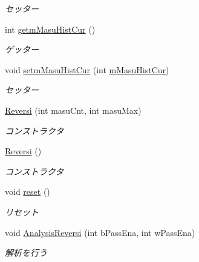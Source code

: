 \begin{DoxyCompactItemize}
\begin{DoxyCompactList}\small\item\em セッター \end{DoxyCompactList}\item 
int \hyperlink{classjp_1_1gr_1_1java__conf_1_1yuta__yoshinaga_1_1reversi_1_1model_1_1_reversi_a0bc45b287c439f0fcce73779a91be405}{getm\+Masu\+Hist\+Cur} ()
\begin{DoxyCompactList}\small\item\em ゲッター \end{DoxyCompactList}\item 
void \hyperlink{classjp_1_1gr_1_1java__conf_1_1yuta__yoshinaga_1_1reversi_1_1model_1_1_reversi_aec45670d2755fc324fec09fc6b6ff89f}{setm\+Masu\+Hist\+Cur} (int \hyperlink{classjp_1_1gr_1_1java__conf_1_1yuta__yoshinaga_1_1reversi_1_1model_1_1_reversi_aaedf62ec913875540109bfbe01bb1969}{m\+Masu\+Hist\+Cur})
\begin{DoxyCompactList}\small\item\em セッター \end{DoxyCompactList}\item 
\hyperlink{classjp_1_1gr_1_1java__conf_1_1yuta__yoshinaga_1_1reversi_1_1model_1_1_reversi_a22abbc9c1a2016388dafb08dc9a7b820}{Reversi} (int masu\+Cnt, int masu\+Max)
\begin{DoxyCompactList}\small\item\em コンストラクタ \end{DoxyCompactList}\item 
\hyperlink{classjp_1_1gr_1_1java__conf_1_1yuta__yoshinaga_1_1reversi_1_1model_1_1_reversi_a26c832c23ff4e38dd2bcf990d05296d6}{Reversi} ()
\begin{DoxyCompactList}\small\item\em コンストラクタ \end{DoxyCompactList}\item 
void \hyperlink{classjp_1_1gr_1_1java__conf_1_1yuta__yoshinaga_1_1reversi_1_1model_1_1_reversi_a497552844cbae36207f2d8c836a26b8e}{reset} ()
\begin{DoxyCompactList}\small\item\em リセット \end{DoxyCompactList}\item 
void \hyperlink{classjp_1_1gr_1_1java__conf_1_1yuta__yoshinaga_1_1reversi_1_1model_1_1_reversi_a43098c043d0424bb5e5e60db358a324d}{Analysis\+Reversi} (int b\+Pass\+Ena, int w\+Pass\+Ena)
\begin{DoxyCompactList}\small\item\em 解析を行う \end{DoxyCompactList}\item 

\end{DoxyCompactItemize}
